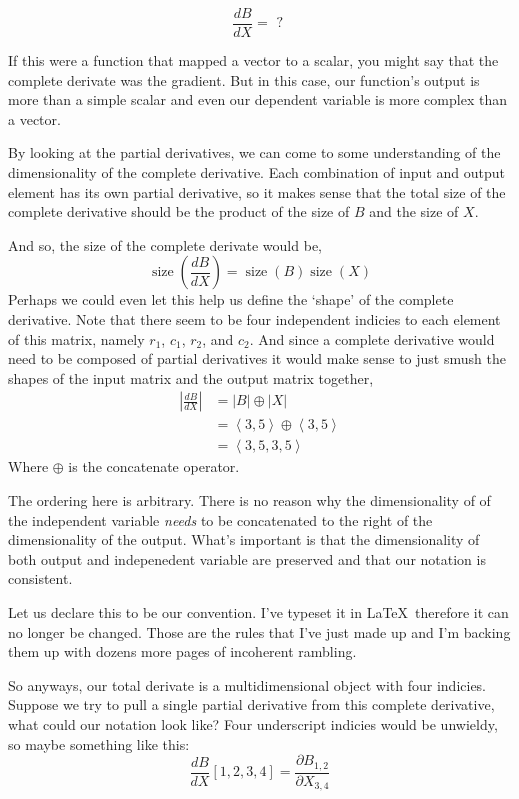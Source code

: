 \documentclass[12pt]{book}
\theoremstyle{plain}
\theoremstyle{definition}
\theoremstyle{ppart}
\theoremstyle{case}
\theoremstyle{solution}
\DeclareMathOperator{\size}{size}
\newcommand{\shape}[1]{\left|#1\right|}
\begin{document}
\[\frac{dB}{dX} = \mbox{ ? }\]

If this were a function that mapped a vector to a scalar, you might say that the
complete derivate was the gradient. But in this case, our function's output is more
than a simple scalar and even our dependent variable is more complex than a vector.

By looking at the partial derivatives, we can come to some understanding of the
dimensionality of the complete derivative. Each combination of input and output
element has its own partial derivative, so it makes sense that the total size
of the complete derivative should be the product of the size of $B$ and the size
of $X$.

And so, the size of the complete derivate would be,
\[
\size\left(\frac{dB}{dX}\right) = \size(B) \size(X)
\]
Perhaps we could even let this help us define the `shape' of the complete
derivative. Note that there seem to be four independent indicies to each element
of this matrix, namely $r_1$, $c_1$, $r_2$, and $c_2$.
And since a complete derivative would need to be composed of partial derivatives
it would make sense to just smush the shapes of the input matrix and the output
matrix together,
\begin{align*}
\shape{\frac{dB}{dX}} &= \shape{B} \oplus \shape{X} \\
 &= \left< 3, 5 \right> \oplus \left< 3, 5 \right> \\
 &= \left< 3, 5, 3, 5 \right>
\end{align*}
Where $\oplus$ is the concatenate operator.

The ordering here is arbitrary. There is no reason why the dimensionality of
of the independent variable \textit{needs} to be concatenated to the right of the
dimensionality of the output. What's important is that the dimensionality of
both output and indepenedent variable are preserved and that our notation is
consistent.

Let us declare this to
be our convention. I've typeset it in \LaTeX ~therefore it can no longer be
changed. Those are the rules that I've just made up and I'm backing them up with
dozens more pages of incoherent rambling.

So anyways, our total derivate is a multidimensional object with four indicies.
Suppose we try to pull a single partial derivative from this complete derivative,
what could our notation look like? Four underscript indicies would be unwieldy,
so maybe something like this:
\[
\frac{dB}{dX}[1,2,3,4] = \frac{\partial B_{1,2}}{\partial X_{3,4}}
\]
\end{document}
